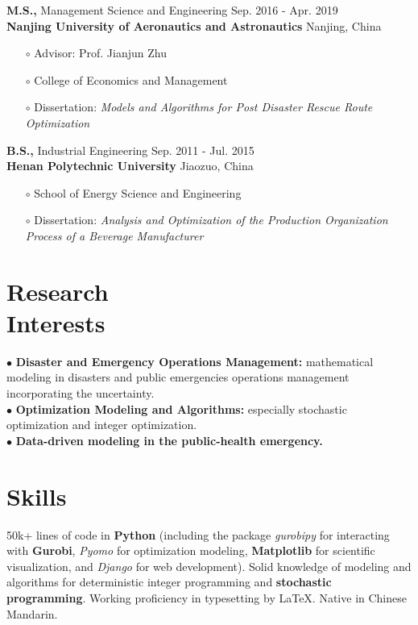 \documentclass[margin]{res}
\begin{document}
\begin{resume}
{\bf M.S.,}  Management Science and Engineering \hfill Sep. 2016 - Apr. 2019 \\
{\bf Nanjing University of Aeronautics and Astronautics} \hfill Nanjing, China
\begin{itemize}  \itemsep -2pt  %
\item[\(\circ\)] Advisor: Prof. Jianjun Zhu
\item[\(\circ\)] College of Economics and Management
\item[\(\circ\)] Dissertation: {\it Models and Algorithms for Post Disaster Rescue Route Optimization}
\end{itemize}\vspace{-.5em}

{\bf B.S.,}  Industrial Engineering \hfill Sep. 2011 - Jul. 2015 \\
{\bf Henan Polytechnic University} \hfill Jiaozuo, China
\begin{itemize}   \itemsep -2pt  %
\item[\(\circ\)] School of Energy Science and Engineering
\item[\(\circ\)] Dissertation: {\it Analysis and Optimization of the Production Organization Process of a Beverage Manufacturer}
\end{itemize}





\section{\sc Research \\Interests}

$\bullet$ {\bf Disaster and Emergency Operations Management:} mathematical modeling in disasters and public emergencies operations management incorporating the uncertainty. \\
$\bullet$ {\bf Optimization Modeling and Algorithms:} especially stochastic optimization and integer optimization. \\
$\bullet$ {\bf Data-driven modeling in the public-health emergency.}





\section{\sc Skills}

50k+ lines of code in {\bf Python} (including the package {\it gurobipy} for interacting with {\bf Gurobi}, {\it Pyomo} for optimization modeling, {\bf Matplotlib} for scientific visualization, and {\it Django} for web development). 
Solid knowledge of modeling and algorithms for deterministic integer programming and {\bf stochastic programming}. 
Working proficiency in typesetting by \LaTeX. Native in Chinese Mandarin.






\end{resume}
\end{document}
